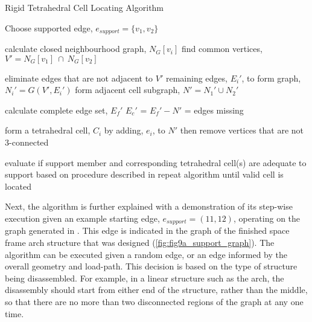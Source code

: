     \vspace{1em}
    \begin{algorithm}[ht]
    	\caption{Rigid Tetrahedral Cell Locating Algorithm}
    	\begin{algorithmic}[1]
    	    \State Choose supported edge, $e_{support} = \{v_1, v_2\}$
    	    
    	    \item[]
		        \State calculate closed neighbourhood graph, $N_G[v_i]$
	        \EndFor
	        \State find common vertices, $V' = N_G[v_1] \ \cap \ N_G[v_2]$
	        
	        \item[]
		        \State eliminate edges that are not adjacent to $V'$
		        \State remaining edges, $E_i'$, to form graph, $N_i' = G(V',E_i')$
	        \EndFor
	        \State form adjacent cell subgraph, $N' = N_1' \cup N_2'$
		    
		    \item[]
		    \State calculate complete edge set, $E_f'$
		    \State $E_c'$ = $E_f' - N'$ = edges missing
		    
		    \item[]
		        \State form a tetrahedral cell, $C_i$ by adding, $e_i$, to $N'$
		        \State then remove vertices that are not 3-connected
	        \EndFor
		    
		    \item[]
		    \State evaluate if support member and corresponding tetrahedral cell(s) are adequate to support based on procedure described in 
		    \State repeat algorithm until valid cell is located
		    
    	\end{algorithmic}
    	\label{algo:cell_find}
    \end{algorithm} 
    
    Next, the algorithm is further explained with a demonstration of its step-wise execution given an example starting edge, $e_{support} = (11,12)$, operating on the graph generated in . This edge is indicated in the graph of the finished space frame arch structure that was designed (\cref{fig:fig9a_support_graph}). The algorithm can be executed given a random edge, or an edge informed by the overall geometry and load-path. This decision is based on the type of structure being disassembled. For example, in a linear structure such as the arch, the disassembly should start from either end of the structure, rather than the middle, so that there are no more than two disconnected regions of the graph at any one time.
    
